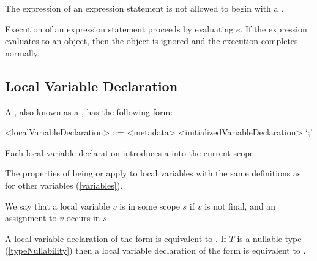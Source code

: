 \documentclass[makeidx]{article}
\begin{document}
\LMHash{}%
The expression of an expression statement is not allowed
to begin with a \lit{\{}.

\LMHash{}%
Execution of an expression statement  proceeds by evaluating $e$.
If the expression evaluates to an object,
then the object is ignored and the execution completes normally.


\subsection{Local Variable Declaration}

\LMHash{}%
A ,
also known as a ,
has the following form:

\begin{grammar}
<localVariableDeclaration> ::= <metadata> <initializedVariableDeclaration> `;'
\end{grammar}

\LMHash{}%
Each local variable declaration introduces
a 
into the current scope.


\LMHash{}%
The properties of being
 or
apply to local variables with the same definitions as for other variables
(\ref{variables}).

\LMHash{}%
We say that a local variable $v$ is 
in some scope $s$
if $v$ is not final, and an assignment to $v$ occurs in $s$.

\LMHash{}%
A local variable declaration of the form  is equivalent to
.
If $T$ is a nullable type
(\ref{typeNullability})
then a local variable declaration of the form 
is equivalent to .
\end{document}
